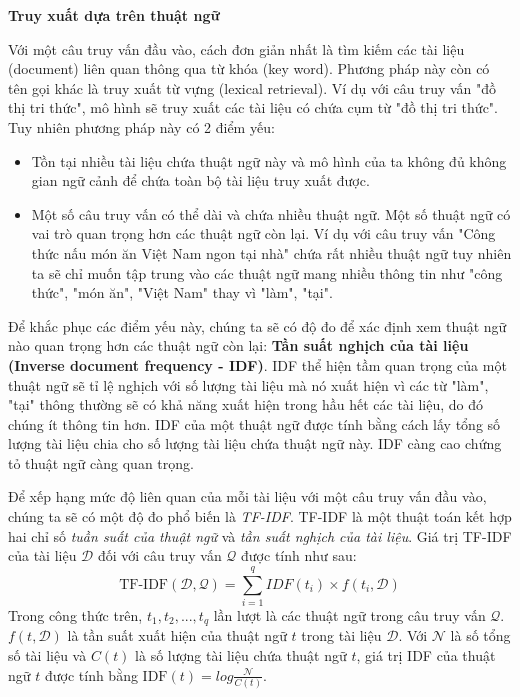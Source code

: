 \vspace{1em}
\textbf{Truy xuất dựa trên thuật ngữ} 

Với một câu truy vấn đầu vào, cách đơn giản nhất là tìm kiếm các tài liệu (document) liên quan thông qua từ khóa (key word). Phương pháp này còn có tên gọi khác là truy xuất từ vựng (lexical retrieval). Ví dụ với câu truy vấn "đồ thị tri thức", mô hình sẽ truy xuất các tài liệu có chứa cụm từ "đồ thị tri thức". Tuy nhiên phương pháp này có 2 điểm yếu:
\begin{itemize}
    \item Tồn tại nhiều tài liệu chứa thuật ngữ này và mô hình của ta không đủ không gian ngữ cảnh để chứa toàn bộ tài liệu truy xuất được.
    \item Một số câu truy vấn có thể dài và chứa nhiều thuật ngữ. Một số thuật ngữ có vai trò quan trọng hơn các thuật ngữ còn lại. Ví dụ với câu truy vấn "Công thức nấu món ăn Việt Nam ngon tại nhà" chứa rất nhiều thuật ngữ tuy nhiên ta sẽ chỉ muốn tập trung vào các thuật ngữ mang nhiều thông tin như "công thức", "món ăn", "Việt Nam" thay vì "làm", "tại".
\end{itemize}

Để khắc phục các điểm yếu này, chúng ta sẽ có độ đo để xác định xem thuật ngữ nào quan trọng hơn các thuật ngữ còn lại: \textbf{Tần suất nghịch của tài liệu (Inverse document frequency - IDF)}. IDF thể hiện tầm quan trọng của một thuật ngữ sẽ tỉ lệ nghịch với số lượng tài liệu mà nó xuất hiện vì các từ "làm", "tại" thông thường sẽ có khả năng xuất hiện trong hầu hết các tài liệu, do đó chúng ít thông tin hơn. IDF của một thuật ngữ được tính bằng cách lấy tổng số lượng tài liệu chia cho số lượng tài liệu chứa thuật ngữ này. IDF càng cao chứng tỏ thuật ngữ càng quan trọng.

Để xếp hạng mức độ liên quan của mỗi tài liệu với một câu truy vấn đầu vào, chúng ta sẽ có một độ đo phổ biến là \textit{TF-IDF}. TF-IDF là một thuật toán kết hợp hai chỉ số \textit{tuần suất của thuật ngữ} và \textit{tần suất nghịch của tài liệu}. Giá trị TF-IDF của tài liệu $\mathcal{D}$ đối với câu truy vấn $\mathcal{Q}$ được tính như sau:
\begin{equation}
    \text{TF-IDF}(\mathcal{D, Q}) = \sum_{i=1}^{q} IDF(t_i) \times f(t_i, \mathcal{D})
\end{equation}
Trong công thức trên, $t_1, t_2,..., t_q$ lần lượt là các thuật ngữ trong câu truy vấn $\mathcal{Q}$. $f(t, \mathcal{D})$ là tần suất xuất hiện của thuật ngữ $t$ trong tài liệu $\mathcal{D}$. Với $\mathcal{N}$ là số tổng số tài liệu và $C(t)$ là số lượng tài liệu chứa thuật ngữ $t$, giá trị IDF của thuật ngữ $t$ được tính bằng $\text{IDF}(t) = log \frac{\mathcal{N}}{C(t)}$.

